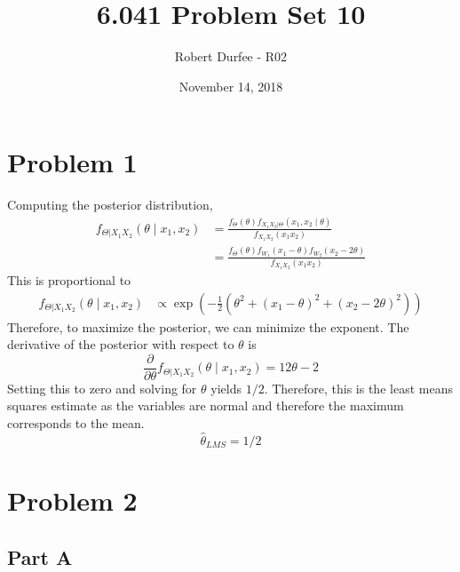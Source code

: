 \documentclass{article}
\title{6.041 Problem Set 10}
\author{Robert Durfee - R02}
\date{November 14, 2018}
\begin{document}
\maketitle

\section*{Problem 1}

Computing the posterior distribution,
\begin{align*}
  f_{\Theta|X_1X_2}(\theta \mid x_1, x_2) &= \frac{f_\Theta(\theta)
  f_{X_1X_2|\Theta}(x_1, x_2 \mid \theta)}{f_{X_1X_2}(x_1 x_2)} \\
  &= \frac{f_\Theta(\theta) f_{W_1}(x_1 - \theta) f_{W_2}(x_2 -
  2\theta)}{f_{X_1X_2}(x_1 x_2)}
\end{align*}
This is proportional to
\begin{align*}
  f_{\Theta|X_1X_2}(\theta \mid x_1, x_2) &\propto
  \exp\left(-\frac{1}{2}\left(\theta^2 + (x_1 - \theta)^2 + (x_2 - 2\theta)^2
  \right)\right)
\end{align*}
Therefore, to maximize the posterior, we can minimize the exponent. The
derivative of the posterior with respect to $\theta$ is
$$ \frac{\partial}{\partial \theta} f_{\Theta|X_1X_2}(\theta \mid x_1, x_2) =
12 \theta - 2 $$
Setting this to zero and solving for $\theta$ yields $ 1/2 $. Therefore, this
is the least means squares estimate as the variables are normal and therefore
the maximum corresponds to the mean.
$$ \hat{\theta}_{LMS} = 1 / 2 $$

\section*{Problem 2}

\subsection*{Part A}
\end{document}
